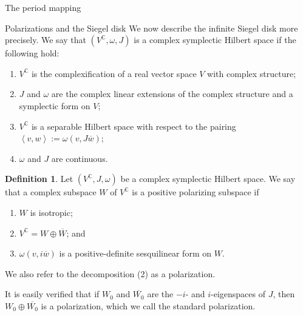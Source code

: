 \documentclass[12pt]{amsart}
\theoremstyle{plain}
\theoremstyle{definition}
\newtheorem{definition}[theorem]{Definition}
\theoremstyle{remark}
\numberwithin{equation}{section} %
\numberwithin{figure}{section} %
\begin{document}
\begin{section}{The period mapping}
\begin{subsection}{Polarizations and the Siegel disk}
  We now describe the infinite Siegel disk more precisely.
  We say that $(V^\mathbb{C},\omega,J)$ is a complex symplectic Hilbert space if the following hold:
  \begin{enumerate} 
   \item $V^\mathbb{C}$ is the complexification of a real vector space $V$ with complex structure;
   \item $J$ and $\omega$ are the complex linear extensions of the complex structure and a symplectic form on $V$;
   \item $V^{\mathbb{C}}$ is a separable Hilbert space with respect to the pairing $\left<v,w \right> := \omega(v, J\overline{w})$;
   \item $\omega$ and $J$ are continuous. 
  \end{enumerate} 
   \begin{definition}  
  Let $(V^{\mathbb{C}},J,\omega)$ be a complex symplectic Hilbert space. We say that a complex subspace $W$ of $V^{\mathbb{C}}$ is a positive polarizing subspace if 
  \begin{enumerate}
      \item $W$ is isotropic;
      \item $V^{\mathbb{C}} = W \oplus \overline{W}$; and
      \item $\omega(v,i\overline{w})$ is a positive-definite sesquilinear form on $W$.  
  \end{enumerate}
  We also refer to the decomposition (2) as a polarization.
  \end{definition}
  It is easily verified that if $W_0$ and $\overline{W_0}$ are the $-i$- and $i$-eigenspaces of $J$, then $W_0 \oplus \overline{W_0}$ is a polarization, which we call the standard polarization.  


\end{subsection}
\end{section}
\end{document}
